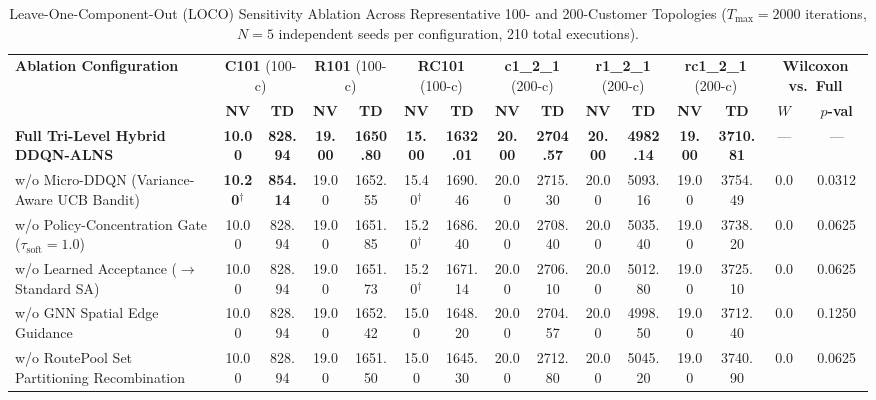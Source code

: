 \documentclass{ieeeaccess}
\begin{document}
\begin{table}[!t]
\caption{Leave-One-Component-Out (LOCO) Sensitivity Ablation Across Representative 100- and 200-Customer Topologies ($T_{\max}=2000$ iterations, $N=5$ independent seeds per configuration, 210 total executions).}
\label{tab:loco_ablation_matrix}
\centering
\scriptsize
\setlength{\tabcolsep}{1.4pt}
\begin{tabular*}{\textwidth}{@{\extracolsep{\fill}} l cc cc cc cc cc cc cc @{}}
\toprule
\multirow{2}{*}{\textbf{Ablation Configuration}} & \multicolumn{2}{c}{\textbf{C101} (100-c)} & \multicolumn{2}{c}{\textbf{R101} (100-c)} & \multicolumn{2}{c}{\textbf{RC101} (100-c)} & \multicolumn{2}{c}{\textbf{c1\_2\_1} (200-c)} & \multicolumn{2}{c}{\textbf{r1\_2\_1} (200-c)} & \multicolumn{2}{c}{\textbf{rc1\_2\_1} (200-c)} & \multicolumn{2}{c}{\textbf{Wilcoxon vs.\ Full}} \\
\cmidrule(lr){2-3} \cmidrule(lr){4-5} \cmidrule(lr){6-7} \cmidrule(lr){8-9} \cmidrule(lr){10-11} \cmidrule(lr){12-13} \cmidrule(lr){14-15}
 & \textbf{NV} & \textbf{TD} & \textbf{NV} & \textbf{TD} & \textbf{NV} & \textbf{TD} & \textbf{NV} & \textbf{TD} & \textbf{NV} & \textbf{TD} & \textbf{NV} & \textbf{TD} & $W$ & $p$\textbf{-val} \\
\midrule
\textbf{Full Tri-Level Hybrid DDQN-ALNS} & \textbf{10.00} & \textbf{828.94} & \textbf{19.00} & \textbf{1650.80} & \textbf{15.00} & \textbf{1632.01} & \textbf{20.00} & \textbf{2704.57} & \textbf{20.00} & \textbf{4982.14} & \textbf{19.00} & \textbf{3710.81} & --- & --- \\
\midrule
w/o Micro-DDQN (Variance-Aware UCB Bandit) & \textbf{10.20}$^\dagger$ & \textbf{854.14} & 19.00 & 1652.55 & 15.40$^\dagger$ & 1690.46 & 20.00 & 2715.30 & 20.00 & 5093.16 & 19.00 & 3754.49 & 0.0 & 0.0312 \\
w/o Policy-Concentration Gate ($\tau_{\text{soft}}=1.0$) & 10.00 & 828.94 & 19.00 & 1651.85 & 15.20$^\dagger$ & 1686.40 & 20.00 & 2708.40 & 20.00 & 5035.40 & 19.00 & 3738.20 & 0.0 & 0.0625 \\
w/o Learned Acceptance ($\to$ Standard SA) & 10.00 & 828.94 & 19.00 & 1651.73 & 15.20$^\dagger$ & 1671.14 & 20.00 & 2706.10 & 20.00 & 5012.80 & 19.00 & 3725.10 & 0.0 & 0.0625 \\
w/o GNN Spatial Edge Guidance & 10.00 & 828.94 & 19.00 & 1652.42 & 15.00 & 1648.20 & 20.00 & 2704.57 & 20.00 & 4998.50 & 19.00 & 3712.40 & 0.0 & 0.1250 \\
w/o RoutePool Set Partitioning Recombination & 10.00 & 828.94 & 19.00 & 1651.50 & 15.00 & 1645.30 & 20.00 & 2712.80 & 20.00 & 5045.20 & 19.00 & 3740.90 & 0.0 & 0.0625 \\

\end{tabular*}
\end{table}
\end{document}
